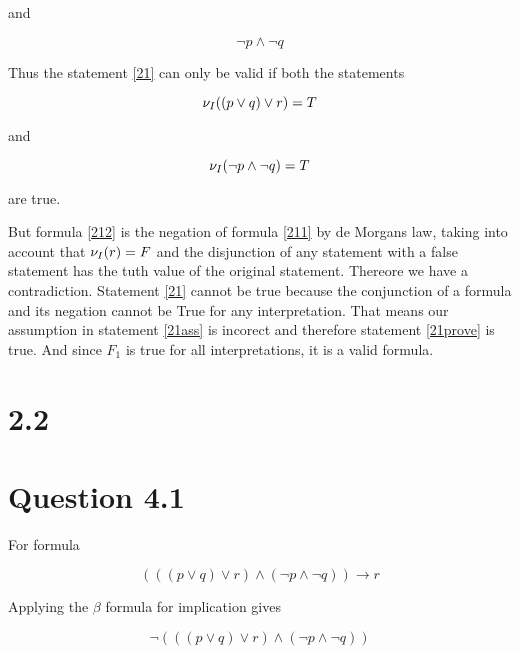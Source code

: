 \documentclass[10pt,a4paper]{article}
\begin{document}
and 

\begin{equation}
\label{212}
\neg p \wedge \neg q 
\end{equation}

Thus the statement \ref{21} can only be valid if both the statements

\begin{equation}
 \nu_I(( p \vee q) \vee r ) = T
\end{equation}

and 

\begin{equation}
 \nu_I( \neg p \wedge \neg q ) = T
\end{equation}

are true.

But formula \ref{212} is the negation of formula \ref{211} by de Morgans law, taking into account that $\nu_I(r) = F$ and the disjunction of any statement with a false statement has the tuth value of the original statement. 
Thereore we have a contradiction. Statement \ref{21} cannot be true because the conjunction of a formula and its negation cannot be True for any interpretation. 
That means our assumption in statement \ref{21ass} is incorect and therefore statement \ref{21prove} is true. And since $F_1$ is true for all interpretations, it is a valid formula.

\section{2.2}

















\section{Question 4.1}
For formula

\begin{equation}
\label{41}
 ((( p \vee q) \vee r ) \wedge ( \neg p \wedge \neg q )) \rightarrow r
\end{equation}

Applying the $\beta$ formula for implication gives

\begin{equation}
\label{411}
 \neg  ((( p \vee q) \vee r ) \wedge ( \neg p \wedge \neg q ))
\end{equation}
\end{document}
